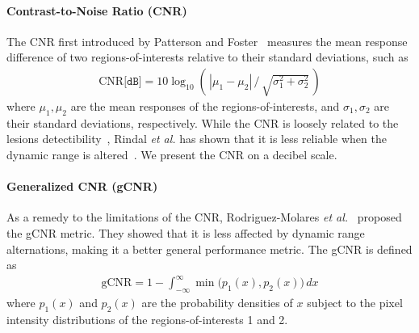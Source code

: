 
%
\paragraph{Contrast-to-Noise Ratio (CNR)}
The CNR first introduced by Patterson and Foster~\cite{patterson_improvement_1983} measures the mean response difference of two regions-of-interests relative to their standard deviations, such as
\begin{align}
  \mathrm{CNR} \texttt{[dB]} = 10 \log_{10} \left(\,| \mu_{1} - \mu_{2} | \,/\, \sqrt{\sigma^2_1 + \sigma^2_2}\, \right)
\end{align}
{\noindent}where \(\mu_1, \mu_2\) are the mean responses of the regions-of-interests, and \(\sigma_1, \sigma_2\) are their standard deviations, respectively.
While the CNR is loosely related to the lesions detectibility~\cite{smith_ultrasound_1984}, Rindal \textit{et al.} has shown that it is less reliable when the dynamic range is altered~\cite{rindal_effect_2019}.
We present the CNR on a decibel scale.


\paragraph{Generalized CNR (gCNR)}
As a remedy to the limitations of the CNR, Rodriguez-Molares \textit{et al.}~\cite{rodriguez-molares_generalized_2020} proposed the gCNR metric.
They showed that it is less affected by dynamic range alternations, making it a better general performance metric.
The gCNR is defined as
{
\begin{align}
  \text{gCNR} = 1 - \int_{-\infty}^{\infty} \min\big(p_1\left(x\right), p_2\left(x\right)\big) \, dx
\end{align}
}
{\noindent}where \(p_1\left(x\right)\) and \(p_2\left(x\right)\) are the probability densities of \(x\) subject to the pixel intensity distributions of the regions-of-interests 1 and 2.

